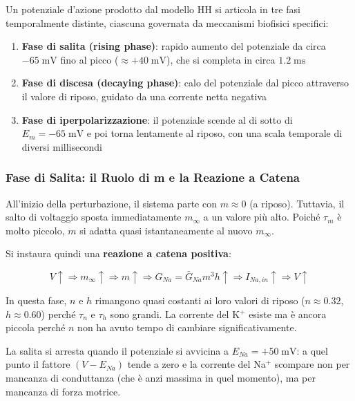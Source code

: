 Un potenziale d'azione prodotto dal modello HH si articola in tre fasi temporalmente distinte, ciascuna governata da meccanismi biofisici specifici:

\begin{enumerate}
    \item \textbf{Fase di salita (rising phase)}: rapido aumento del potenziale da circa $-65 \; \text{mV}$ fino al picco ($\approx +40 \; \text{mV}$), che si completa in circa $1.2 \; \text{ms}$
    \item \textbf{Fase di discesa (decaying phase)}: calo del potenziale dal picco attraverso il valore di riposo, guidato da una corrente netta negativa
    \item \textbf{Fase di iperpolarizzazione}: il potenziale scende al di sotto di $E_m = -65 \; \text{mV}$ e poi torna lentamente al riposo, con una scala temporale di diversi millisecondi
\end{enumerate}

\subsubsection{Fase di Salita: il Ruolo di m e la Reazione a Catena}

All'inizio della perturbazione, il sistema parte con $m \approx 0$ (a riposo). Tuttavia, il salto di voltaggio sposta immediatamente $m_\infty$ a un valore più alto. Poiché $\tau_m$ è molto piccolo, $m$ si adatta quasi istantaneamente al nuovo $m_\infty$.

Si instaura quindi una \textbf{reazione a catena positiva}:

\begin{equation}
V \uparrow \Rightarrow m_\infty \uparrow \Rightarrow m \uparrow \Rightarrow G_{Na} = \bar{G}_{Na} m^3 h \uparrow \Rightarrow I_{Na,in} \uparrow \Rightarrow V \uparrow
\end{equation}

In questa fase, $n$ e $h$ rimangono quasi costanti ai loro valori di riposo ($n \approx 0.32$, $h \approx 0.60$) perché $\tau_n$ e $\tau_h$ sono grandi. La corrente del K$^+$ esiste ma è ancora piccola perché $n$ non ha avuto tempo di cambiare significativamente.

La salita si arresta quando il potenziale si avvicina a $E_{Na} = +50 \; \text{mV}$: a quel punto il fattore $(V - E_{Na})$ tende a zero e la corrente del Na$^+$ scompare non per mancanza di conduttanza (che è anzi massima in quel momento), ma per mancanza di forza motrice.

